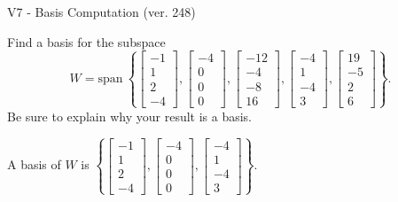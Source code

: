 \begin{exercise}
  \begin{exerciseTitle}V7 - Basis Computation (ver. 248)\end{exerciseTitle}
  \begin{exerciseStatement}
    Find a basis for the subspace 
\[W=\mathrm{span}\ \left\{\left[\begin{array}{r}
-1 \\
1 \\
2 \\
-4
\end{array}\right] , \left[\begin{array}{r}
-4 \\
0 \\
0 \\
0
\end{array}\right] , \left[\begin{array}{r}
-12 \\
-4 \\
-8 \\
16
\end{array}\right] , \left[\begin{array}{r}
-4 \\
1 \\
-4 \\
3
\end{array}\right] , \left[\begin{array}{r}
19 \\
-5 \\
2 \\
6
\end{array}\right]\right\}.\]
 Be sure to explain why your result is a basis.


  \end{exerciseStatement}
  \begin{exerciseAnswer}
   A basis of \(W\) is  \(\left\{\left[\begin{array}{r}
-1 \\
1 \\
2 \\
-4
\end{array}\right] , \left[\begin{array}{r}
-4 \\
0 \\
0 \\
0
\end{array}\right] , \left[\begin{array}{r}
-4 \\
1 \\
-4 \\
3
\end{array}\right]\right\}\).
  


  \end{exerciseAnswer}
\end{exercise}